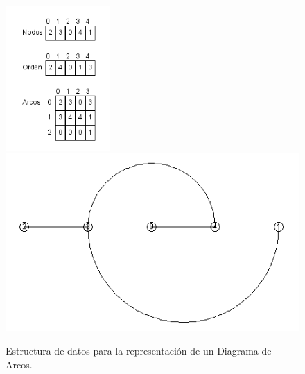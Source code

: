 	\begin{figure}
		\centering
		\includegraphics[width=4cm]{imagenes/representacion_ejemplo_1.png}
		\includegraphics[scale=2.5]{imagenes/representacion_ejemplo_2.png}
		\caption{Estructura de datos para la representación de un Diagrama de Arcos.}
		\label{fig:representacion_diagrama_arcos}
	\end{figure}
	
